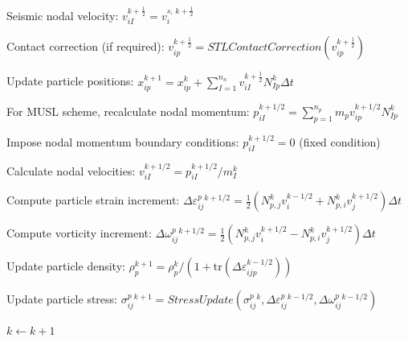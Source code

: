 \begin{algorithm}
\begin{algorithmic}[1]
		\State Seismic nodal velocity:
		$ v_{iI}^{k+\frac12} = v_i^{s,\,k+\frac12}$
		
		\State Contact correction (if required):
		$ v_{ip}^{k+\frac12} = \textit{STLContactCorrection}(v_{ip}^{k+\frac12}) $
		
		\State Update particle positions:
		$ x_{ip}^{k+1} = x_{ip}^{k} + \sum_{I=1}^{n_n} v_{iI}^{k+\frac12} N_{Ip}^k \Delta t $
		
		\State For MUSL scheme, recalculate nodal momentum:
		$ p_{iI}^{k+1/2} = \sum_{p=1}^{n_p} m_p v_{ip}^{k+1/2} N_{Ip}^k $
		
		\State Impose nodal momentum boundary conditions:
		$p_{iI}^{k+1/2} = 0 $ (fixed condition)
		
		\State Calculate nodal velocities:
		$ v_{iI}^{k+1/2} = p_{iI}^{k+1/2} / m_I^k $
		
		\State Compute particle strain increment:
		$ \Delta \varepsilon_{ij}^p{}^{k+1/2} = \frac{1}{2}\left( N_{p,j}^k v_i^{k-1/2} + N_{p,i}^k v_j^{k+1/2}\right)\Delta t $
		
		\State Compute vorticity increment: 
		$ \Delta \omega_{ij}^p{}^{k+1/2} = \frac{1}{2}\left(N_{p,j}^k v_i^{k+1/2}- N_{p,i}^k v_j^{k+1/2} \right) \Delta t $
		
		\State Update particle density:
		$ \rho_p^{k+1} = \rho_p^{k} / (1 + \text{tr}(\Delta \varepsilon_{ijp}^{k-1/2})) $
		
		\State Update particle stress:
		$ \sigma_{ij}^{p}{}^{k+1} = \textit{StressUpdate}(\sigma_{ij}^{p}{}^{k}, \Delta \varepsilon_{ij}^p{}^{k-1/2}, \Delta \omega_{ij}^p{}^{k-1/2} ) $
		
		\State $k \leftarrow k + 1$
		
	\end{algorithmic}
\end{algorithm}
